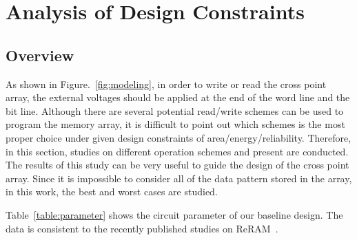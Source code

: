 \vspace{10pt}
\section{Analysis of Design Constraints}\label{sec:wr}
\subsection{Overview}
As shown in Figure.~\ref{fig:modeling}, in order to write or read the cross point array, the external voltages should be applied at the end of the word line and the bit line. Although there are several potential read/write schemes can be used to program the memory array, it is difficult to point out which schemes is the most proper choice under given design constraints of area/energy/reliability. Therefore, in this section, studies on different operation schemes and present are conducted. The results of this study can be very useful to guide the design of the cross point array. Since it is impossible to consider all of the data pattern stored in the array, in this work, the best and worst cases are studied.

Table~\ref{table:parameter} shows the circuit parameter of our baseline design. The data is consistent to the recently published studies on ReRAM~\cite{crossbar_TED_2010}\cite{memristor:Cong}.

